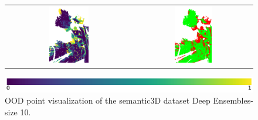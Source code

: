 \begin{figure}[h!]
\begin{tabular}{cc}
            \includegraphics[width=0.33\textwidth, height=0.18\textheight]{images/ood_imgs/de_sem3d/de_ent_10_3.pdf}& 
            \includegraphics[width=0.33\textwidth, height=0.18\textheight]{images/ood_imgs/de_sem3d/de_ent_ood_auroc_3.pdf}\\
        \end{tabular}
        \includegraphics[scale=0.45]{images/prob_legend.pdf}
        \caption{OOD point visualization of the semantic3D dataset Deep Ensembles-size 10.}
        \label{fig:de_ood_auroc_sem3d_ent}
    \end{figure}
